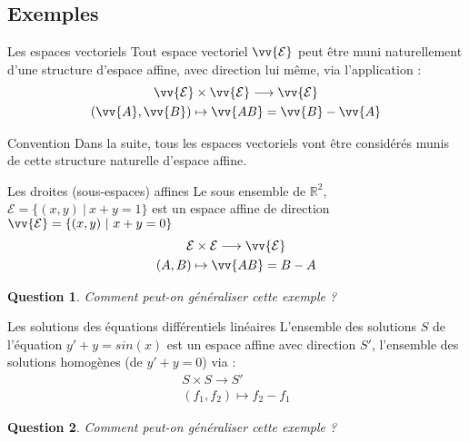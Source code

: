 \documentclass[aspectratio=1610 %
]{beamer}
\newtheorem{question}{Question}
\let\ens\mathcal
\begin{document}
\subsection{Exemples}
  \begin{frame}{Les espaces vectoriels}
    Tout espace vectoriel $\vv{\ens{E}}$ peut être muni naturellement d'une structure d'espace affine, avec direction lui même, via l'application :
    \begin{gather*}
      \vv{\ens{E}} \times \vv{\ens{E}} \longrightarrow \vv{\ens{E}}\\
      (\vv{A},\vv{B}) \mapsto \vv{AB}=\vv{B}-\vv{A}
    \end{gather*}\pause
    \begin{block}{Convention}
      Dans la suite, tous les espaces vectoriels vont être considérés munis de cette structure naturelle d'espace affine.
    \end{block}
  \end{frame}
  \begin{frame}{Les droites (sous-espaces) affines}
    Le sous ensemble de $\mathbb{R}^{2}$, $\ens{E}=\{(x,y)\ |\ x+y=1 \}$ est un espace affine de direction $\vv{\ens{E}}=\{(x,y)\ |\ x+y=0 \}$
    \begin{gather*}
      \ens{E} \times \ens{E} \longrightarrow \vv{\ens{E}}\\
      (A,B) \mapsto \vv{AB}=B-A
    \end{gather*}\pause
    \begin{question}
      Comment peut-on généraliser cette exemple ?
    \end{question}
  \end{frame}
  \begin{frame}{Les solutions des équations différentiels linéaires}
    L'ensemble des solutions $S$ de l'équation $y'+y=sin(x)$ est un espace affine avec direction $S'$, l'ensemble des solutions homogènes (de $y'+y=0$) via :
    \begin{gather*}
      S \times S \longrightarrow S'\\
      (f_{1},f_{2}) \mapsto f_{2}-f_{1}
    \end{gather*}\pause
    \begin{question}
      Comment peut-on généraliser cette exemple ?
    \end{question}
  \end{frame}
\end{document}
